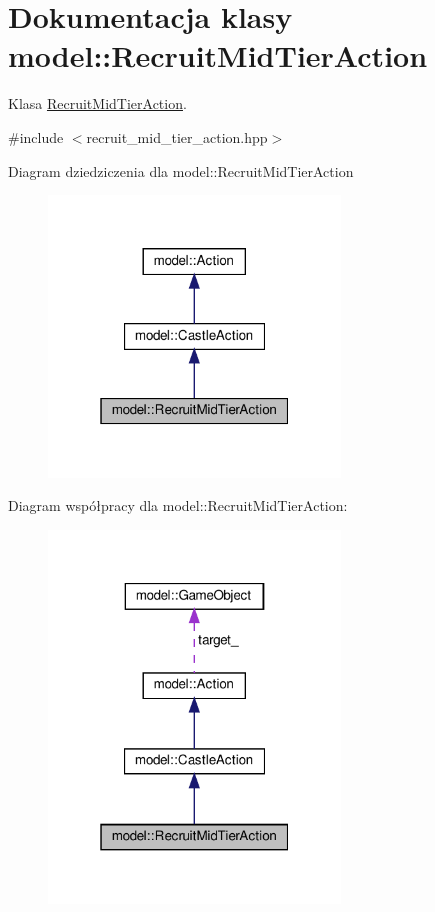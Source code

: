 \hypertarget{classmodel_1_1RecruitMidTierAction}{}\section{Dokumentacja klasy model\+:\+:Recruit\+Mid\+Tier\+Action}
\label{classmodel_1_1RecruitMidTierAction}


Klasa \hyperlink{classmodel_1_1RecruitMidTierAction}{Recruit\+Mid\+Tier\+Action}.  




{\ttfamily \#include $<$recruit\+\_\+mid\+\_\+tier\+\_\+action.\+hpp$>$}



Diagram dziedziczenia dla model\+:\+:Recruit\+Mid\+Tier\+Action\nopagebreak
\begin{figure}[H]
\begin{center}
\leavevmode
\includegraphics[width=220pt]{classmodel_1_1RecruitMidTierAction__inherit__graph}
\end{center}
\end{figure}


Diagram współpracy dla model\+:\+:Recruit\+Mid\+Tier\+Action\+:\nopagebreak
\begin{figure}[H]
\begin{center}
\leavevmode
\includegraphics[width=220pt]{classmodel_1_1RecruitMidTierAction__coll__graph}
\end{center}
\end{figure}
